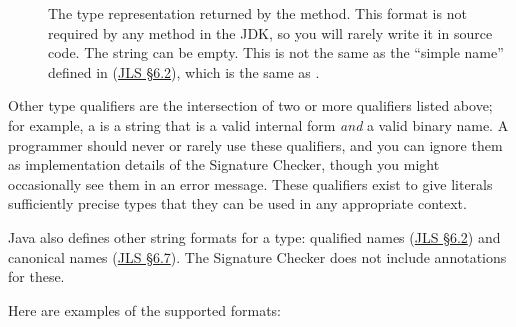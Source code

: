 \begin{description}
\item[]
  The type representation returned by the
  method.  This format is not required by any method in the JDK, so you
  will rarely write it in source code.  The string can be empty.  This
  is not the same as the ``simple name'' defined in
  (\href{https://docs.oracle.com/javase/specs/jls/se10/html/jls-6.html#jls-6.2}{JLS
    \S 6.2}), which is the same as
  .

\end{description}

Other type qualifiers are the intersection of two or more qualifiers listed
above; for example, a
 is a string
that is a valid internal form \emph{and} a valid binary name.  A
programmer should never or rarely use these qualifiers, and you can ignore
them as implementation details of the Signature Checker, though you might
occasionally see them in an error message.  These qualifiers exist to give
literals sufficiently precise types that they can be used in any
appropriate context.

Java also defines other string formats for a type:  qualified names
(\href{https://docs.oracle.com/javase/specs/jls/se10/html/jls-6.html#jls-6.2}{JLS
  \S 6.2}) and canonical names
(\href{https://docs.oracle.com/javase/specs/jls/se10/html/jls-6.html#jls-6.7}{JLS
  \S 6.7}).  The Signature Checker does not include annotations for these.

Here are examples of the supported formats:
\label{signature-annotations-examples}


\newcommand{\naforanon}{\emph{n/a {\smaller for anonymous class}}}
\newcommand{\naforanonarray}{\emph{n/a {\smaller for array of anon.~class}}}
\newcommand{\naforprim}{\emph{n/a {\smaller for primitive type}}}
\newcommand{\naforarray}{\emph{n/a {\smaller for array type}}}
\newcommand{\emptystring}{\emph{\smaller (empty string)}}

